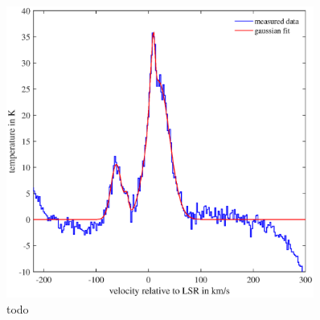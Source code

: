 \begin{figure}[H]
    \centering
    \includegraphics[width= 0.9\textwidth]{plots/TestBaseline.eps}
    \caption{todo}
    \label{fig:TestBaseline}
\end{figure}